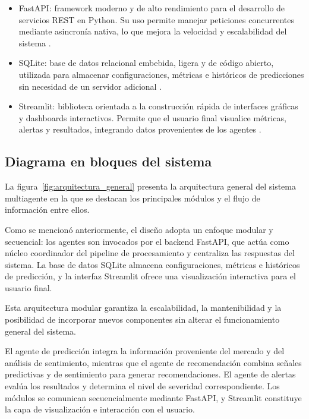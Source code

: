   \begin{itemize}
      \item FastAPI: framework moderno y de alto rendimiento para el
      desarrollo de servicios REST en Python. Su uso permite manejar peticiones
      concurrentes mediante asincronía nativa, lo que mejora la velocidad y
      escalabilidad del sistema \parencite{fastapi2024}.
      \item SQLite: base de datos relacional embebida, ligera y de código
      abierto, utilizada para almacenar configuraciones, métricas e históricos de
      predicciones sin necesidad de un servidor adicional \parencite{sqlite2023}.
      \item Streamlit: biblioteca orientada a la construcción rápida de
      interfaces gráficas y dashboards interactivos. Permite que el usuario final
      visualice métricas, alertas y resultados, integrando datos provenientes de
      los agentes \parencite{streamlit2024}.
  \end{itemize}

\subsection{Diagrama en bloques del sistema}

  La figura~\ref{fig:arquitectura_general} presenta la arquitectura general del
  sistema multiagente en la que se destacan los principales módulos y el flujo de
  información entre ellos.

  Como se mencionó anteriormente, el diseño adopta un enfoque modular y secuencial:
  los agentes son invocados por el backend FastAPI, que actúa como núcleo coordinador
  del pipeline de procesamiento y centraliza las respuestas del sistema. La base de
  datos SQLite almacena configuraciones, métricas e históricos de predicción, y la
  interfaz Streamlit ofrece una visualización interactiva para el usuario final.

  Esta arquitectura modular garantiza la escalabilidad, la mantenibilidad y la
  posibilidad de incorporar nuevos componentes sin alterar el funcionamiento general
  del sistema.

  El agente de predicción integra la información proveniente del mercado y del
  análisis de sentimiento, mientras que el agente de recomendación combina señales
  predictivas y de sentimiento para generar recomendaciones. El agente de alertas
  evalúa los resultados y determina el nivel de severidad correspondiente. Los
  módulos se comunican secuencialmente mediante FastAPI, y Streamlit constituye
  la capa de visualización e interacción con el usuario.
  
